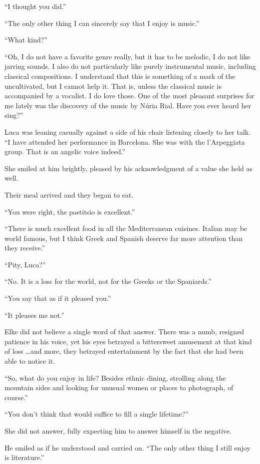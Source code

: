 ``I thought you did.''

``The only other thing I can sincerely say that I enjoy is music.''

``What kind?''

``Oh, I do not have a favorite genre really, but it has to be melodic, I do not like jarring sounds. I also do not particularly like purely instrumental music, including classical compositions. I understand that this is something of a mark of the uncultivated, but I cannot help it. That is, unless the classical music is accompanied by a vocalist. I do love those. One of the most pleasant surprises for me lately was the discovery of the music by Núria Rial. Have you ever heard her sing?''

Luca was leaning casually against a side of his chair listening closely to her talk. ``I have attended her performance in Barcelona. She was with the l'Arpeggiata group. That is an angelic voice indeed.''

She smiled at him brightly, pleased by his acknowledgment of a value she held as well.

Their meal arrived and they began to eat.

``You were right, the pastitsio is excellent.''

``There is much excellent food in all the Mediterranean cuisines. Italian may be world famous, but I think Greek and Spanish deserve far more attention than they receive.''

``Pity, Luca?''

``No. It is a loss for the world, not for the Greeks or the Spaniards.''

``You say that as if it pleased you.''

``It pleases me not.''

Elke did not believe a single word of that answer. There was a numb, resigned patience in his voice, yet his eyes betrayed a bittersweet amusement at that kind of loss \ldots and more, they betrayed entertainment by the fact that she had been able to notice it.

``So, what do you enjoy in life? Besides ethnic dining, strolling along the mountain sides and looking for unusual women or places to photograph, of course.''

``You don't think that would suffice to fill a single lifetime?''

She did not answer, fully expecting him to answer himself in the negative.

He smiled as if he understood and carried on. ``The only other thing I still enjoy is literature.''

